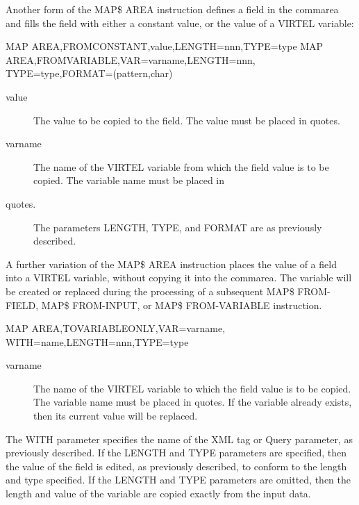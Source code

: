\documentclass[letterpaper,10pt,english]{sphinxmanual}
\begin{document}
Another form of the MAP\$ AREA instruction defines a field in the commarea and fills the field with either a constant value, or the value of a VIRTEL variable:

\begin{sphinxVerbatim}[commandchars=\\\{\}]
MAP\PYGZdl{} AREA,FROM\PYGZhy{}CONSTANT,\PYGZsq{}value\PYGZsq{},LENGTH=nnn,TYPE=type
MAP\PYGZdl{} AREA,FROM\PYGZhy{}VARIABLE,VAR=\PYGZsq{}varname\PYGZsq{},LENGTH=nnn,
    TYPE=type,FORMAT=(\PYGZsq{}pattern\PYGZsq{},char)
\end{sphinxVerbatim}
\begin{description}
\item[{value}] \leavevmode
The value to be copied to the field. The value must be placed in quotes.

\item[{varname}] \leavevmode
The name of the VIRTEL variable from which the field value is to be copied. The variable name must be placed in

\item[{quotes.}] \leavevmode
The parameters LENGTH, TYPE, and FORMAT are as previously described.

\end{description}

A further variation of the MAP\$ AREA instruction places the value of a field into a VIRTEL variable, without copying it
into the commarea. The variable will be created or replaced during the processing of a subsequent MAP\$ FROM-FIELD, MAP\$ FROM-INPUT, or MAP\$ FROM-VARIABLE instruction.

\begin{sphinxVerbatim}[commandchars=\\\{\}]
MAP\PYGZdl{} AREA,TO\PYGZhy{}VARIABLE\PYGZhy{}ONLY,VAR=\PYGZsq{}varname\PYGZsq{},
WITH=\PYGZsq{}name\PYGZsq{},LENGTH=nnn,TYPE=type
\end{sphinxVerbatim}
\begin{description}
\item[{varname}] \leavevmode
The name of the VIRTEL variable to which the field value is to be copied. The variable name must be placed in quotes. If the variable already exists, then its current value will be replaced.

\end{description}

The WITH parameter specifies the name of the XML tag or Query parameter, as previously described. If the LENGTH and TYPE parameters are specified, then the value of the field is edited, as previously described, to conform to the length and type specified. If the LENGTH and TYPE parameters are omitted, then the length and value of the variable
are copied exactly from the input data.
\end{document}
